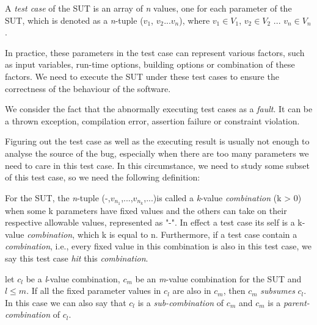\documentclass{sig-alternate}
\begin{document}
\begin{definition}
A \emph{test case} of the SUT is an array of \emph{n} values, one for each parameter of the SUT, which is denoted as a \emph{n}-tuple ($v_{1}$, $v_{2}$...$v_{n}$), where $v_{1}\in V_{1}$, $v_{2} \in V_{2}$ ... $v_{n} \in V_{n}$.
\end{definition}

In practice, these parameters in the test case can represent various factors, such as input variables, run-time options, building options or combination of these factors. We need to execute the SUT under these test cases to ensure the correctness of the behaviour of the software.

\begin{definition}
We consider the fact that the abnormally executing test cases as a \emph{fault}. It can be a thrown exception, compilation error, assertion failure or constraint violation.
\end{definition}

Figuring out the test case as well as the executing result is usually not enough to analyse the source of the bug, especially when there are too many parameters we need to care in this test case. In this circumstance, we need to study some subset of this test case, so we need the following definition:

\begin{definition}
For the SUT, the \emph{n}-tuple (-,$v_{n_{1}}$,...,$v_{n_{k}}$,...)is called a \emph{k}-value \emph{combination} (k > 0) when some k parameters have fixed values and the others can take on their respective allowable values, represented as "-". In effect a test case its self is a k-value \emph{combination}, which k is equal to n. Furthermore, if a test case contain a \emph{combination}, i.e., every fixed value in this combination is also in this test case, we say this test case \emph{hit} this \emph{combination}.
\end{definition}

\begin{definition}
let $c_{l}$ be a \emph{l}-value combination, $c_{m}$ be an \emph{m}-value combination for the SUT and $l \leq m$. If all the fixed parameter values in $c_{l}$ are also in $c_{m}$, then $c_{m}$ \emph{subsumes} $c_{l}$. In this case we can also say that $c_{l}$ is a \emph{sub-combination} of $c_{m}$ and $c_{m}$ is a \emph{parent-combination} of $c_{l}$.
\end{definition}
\end{document}
